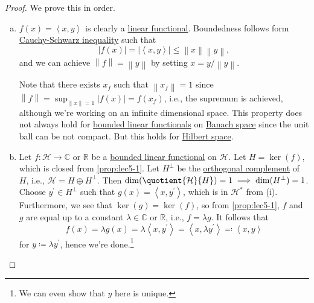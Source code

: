 \begin{proof}
	We prove this in order.
	\begin{enumerate}[(a)]
		\item \(f(x)= \left\langle x, y \right\rangle \) is clearly a \hyperref[def:linear-functional]{linear functional}. Boundedness follows form \hyperref[thm:Cauchy-Schwarz-ineq]{Cauchy-Schwarz inequality} such that
		      \[
			      \left\vert f(x) \right\vert = \left\vert \left\langle x, y \right\rangle  \right\vert \leq \left\lVert x\right\rVert \left\lVert y\right\rVert ,
		      \]
		      and we can achieve \(\left\lVert f\right\rVert = \left\lVert y\right\rVert \) by setting \(x = y / \left\lVert y\right\rVert \).
		      \begin{note}
			      Note that there exists \(x_f\) such that \(\left\lVert x_f\right\rVert = 1\) since \(\left\lVert f\right\rVert = \sup _{\left\lVert x\right\rVert = 1} \left\vert f(x) \right\vert = f(x_f)\), i.e., the supremum is achieved, although we're working on an infinite dimensional space. This property does not always hold for \hyperref[def:bounded-linear-functional]{bounded linear functionals} on \hyperref[def:Banach-space]{Banach space} since the unit ball can be not compact. But this holds for \hyperref[def:Hilbert-space]{Hilbert space}.
		      \end{note}
		\item Let \(f\colon \mathcal{H} \to \mathbb{C} \) or \(\mathbb{R} \) be a \hyperref[def:bounded-linear-functional]{bounded linear functional} on \(\mathcal{H} \). Let \(H = \ker(f)\), which is closed from \autoref{prop:lec5-1}. Let \(H ^\perp\) be the \hyperref[def:orthogonal-complement]{orthogonal complement} of \(H\), i.e., \(\mathcal{H} = H\oplus H^\perp\). Then \(\dim (\quotient{\mathcal{H} }{H} )= 1\implies \dim(H^\perp) = 1\). Choose \(y^\prime \in H^\perp\) such that \(g(x) = \left\langle x, y^\prime \right\rangle \), which is in \(\mathcal{H} ^{\ast} \) from (i). Furthermore, we see that \(\ker(g) = \ker(f)\), so from \autoref{prop:lec5-1}, \(f\) and \(g\) are equal up to a constant \(\lambda \in \mathbb{C} \) or \(\mathbb{R} \), i.e., \(f = \lambda g\). It follows that
		      \[
			      f(x) = \lambda g(x) = \lambda \left\langle x, y^\prime \right\rangle = \left\langle x, \lambda y^\prime \right\rangle \eqqcolon \left\langle x, y \right\rangle
		      \]
		      for \(y \coloneqq \lambda y^\prime \), hence we're done.\footnote{We can even show that \(y\) here is unique.}
	\end{enumerate}
\end{proof}

